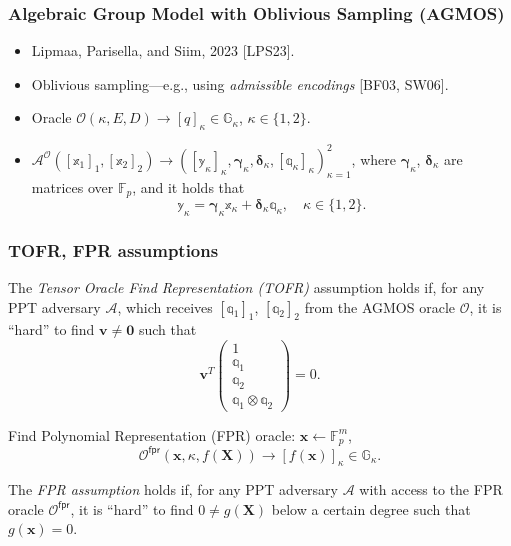 \documentclass[9pt]{beamer}
\newcommand{\F}{\mathbb{F}}
\newcommand{\G}{\mathbb{G}}
\newcommand{\A}{\mathcal A}  %
\newcommand{\Oracle}{\mathcal{O}}  %
\newcommand{\fpr}{\mathsf{fpr}}  %
\begin{document}
\begin{frame}
\frametitle{Algebraic Group Model with Oblivious Sampling (AGMOS)}
\begin{itemize}
    \item Lipmaa, Parisella, and Siim, 2023 [LPS23].
    \item Oblivious sampling---e.g., using \emph{admissible encodings} [BF03, SW06].
    \item Oracle $ \Oracle(\kappa, E, D) \to [q]_\kappa \in \G_\kappa $, $ \kappa \in \{ 1, 2 \} $.
    \item \(
    \A^{\Oracle}([\mathbb x_1]_1, [\mathbb x_2]_2) \to
    ([\mathbb y_\kappa]_\kappa, \bm \gamma_\kappa, \bm \delta_\kappa, [\mathbb q_\kappa]_\kappa)_{\kappa=1}^2
    \), where $ \bm{\gamma}_\kappa $, $ \bm{\delta}_\kappa $ are matrices over $ \F_p $, and it holds that 
    \begin{equation*}
    \mathbb y_\kappa = \bm{\gamma}_\kappa \mathbb x_\kappa + \bm \delta_\kappa \mathbb q_\kappa, \quad 
    \kappa \in \{ 1, 2 \}.
    \end{equation*}
\end{itemize}   
\end{frame}


\begin{frame}
\frametitle{TOFR, FPR assumptions}
\begin{definition}
    The \emph{Tensor Oracle Find Representation (TOFR)} assumption holds if, for any PPT adversary $ \A $, which receives $ [\mathbb q_1]_1 $, $ [\mathbb q_2]_2 $ from the AGMOS oracle $ \Oracle $, it is ``hard'' to find $ \bm v \neq \bm 0 $ such that
    \[
    \bm v^T 
    \begin{pmatrix}
         1 \\
         \mathbb q_1 \\
         \mathbb q_2 \\
         \mathbb q_1 \otimes \mathbb q_2
    \end{pmatrix}
    = 0.
    \]
\end{definition}
Find Polynomial Representation (FPR) oracle: $ \bm x \gets \F_p^m $, 
\[ 
\Oracle^\fpr(\bm x, \kappa, f(\bm X)) \to [f(\bm x)]_\kappa \in \G_\kappa.
\]
\begin{definition}
    The \textit{FPR assumption} holds if, for any PPT adversary $ \A $ with access to the FPR oracle $ \Oracle^\fpr $, it is ``hard'' to find $ 0 \neq g(\bm X) $ below a certain degree such that $ g(\bm x) = 0 $.
\end{definition}
\end{frame}
\end{document}
